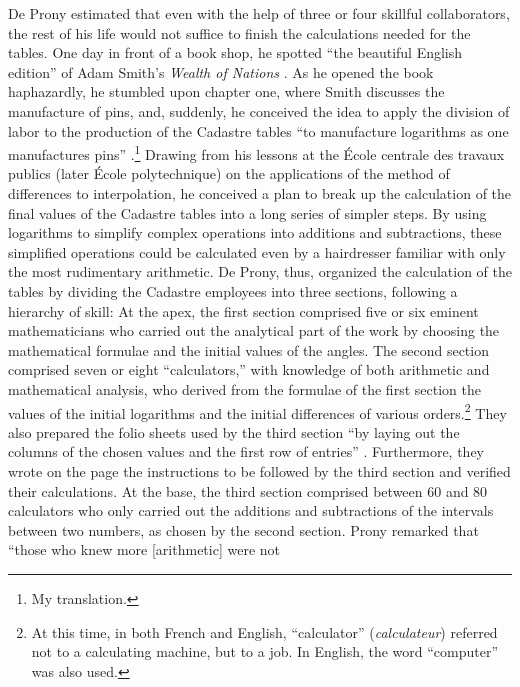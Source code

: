 \documentclass[version=last,draft=false,paper=A4,portrait,twoside=true,twocolumn=false,headinclude=false,footinclude=false,fontsize=12,BCOR=20mm,DIV=calc,pagesize=auto,titlepage=firstiscover,mpinclude=false,open=right,chapterprefix=true,numbers=autoendperiod,headsepline=false,headings=twolinechapter,parskip=false]{scrbook}
\begin{document}
De Prony estimated that even with the help of three or four skillful
collaborators, the rest of his life would not suffice to finish the
calculations needed for the tables. One day in front of a book shop, he
spotted ``the beautiful English edition'' of Adam Smith's \emph{Wealth of Nations}
\autocite[7]{firmin-didot1820}. As he opened the book haphazardly, he
stumbled upon chapter one, where Smith discusses the manufacture of pins,
and, suddenly, he conceived the idea to apply the division of labor to the
production of the Cadastre tables ``to manufacture logarithms as one
manufactures pins'' \autocite[35]{prony1824}.\footnote{My translation.} Drawing from his
lessons at the École centrale des travaux publics (later École
polytechnique) on the applications of the method of differences to
interpolation, he conceived a plan to break up the calculation of the final
values of the Cadastre tables into a long series of simpler steps. By using
logarithms to simplify complex operations into additions and subtractions,
these simplified operations could be calculated even by a hairdresser
familiar with only the most rudimentary arithmetic. De Prony, thus,
organized the calculation of the tables by dividing the Cadastre employees
into three sections, following a hierarchy of skill: At the apex, the first
section comprised five or six eminent mathematicians who carried out the
analytical part of the work by choosing the mathematical formulae and the
initial values of the angles. The second section comprised seven or eight
``calculators,'' with knowledge of both arithmetic and mathematical
analysis, who derived from the formulae of the first section the values of
the initial logarithms and the initial differences of various
orders.\footnote{At this time, in both French and English, ``calculator''
(\emph{calculateur}) referred not to a calculating machine, but to a job. In
English, the word ``computer'' was also used.} They also prepared the folio sheets used by the third
section ``by laying out the columns of the chosen values and the first row
of entries'' \autocite[109]{grattan-guinness2003}. Furthermore, they
wrote on the page the instructions to be followed by the third section and
verified their calculations. At the base, the third section comprised
between 60 and 80 calculators who only carried out the additions and
subtractions of the intervals between two numbers, as chosen by the second
section. Prony remarked that ``those who knew more [arithmetic] were not
\end{document}
